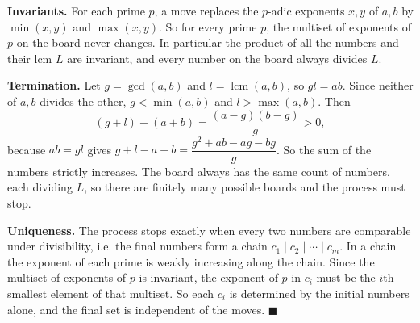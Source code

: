 \textbf{Invariants.} For each prime $p$, a move replaces the $p$-adic exponents $x,y$ of $a,b$ by $\min(x,y)$ and $\max(x,y)$. So for every prime $p$, the multiset of exponents of $p$ on the board never changes. In particular the product of all the numbers and their lcm $L$ are invariant, and every number on the board always divides $L$.

\textbf{Termination.} Let $g=\gcd(a,b)$ and $l=\operatorname{lcm}(a,b)$, so $gl=ab$. Since neither of $a,b$ divides the other, $g<\min(a,b)$ and $l>\max(a,b)$. Then
\[(g+l)-(a+b)=\dfrac{(a-g)(b-g)}{g}>0,\]
because $ab=gl$ gives $g+l-a-b=\dfrac{g^2+ab-ag-bg}{g}$. So the sum of the numbers strictly increases. The board always has the same count of numbers, each dividing $L$, so there are finitely many possible boards and the process must stop.

\textbf{Uniqueness.} The process stops exactly when every two numbers are comparable under divisibility, i.e. the final numbers form a chain $c_1\mid c_2\mid\cdots\mid c_m$. In a chain the exponent of each prime is weakly increasing along the chain. Since the multiset of exponents of $p$ is invariant, the exponent of $p$ in $c_i$ must be the $i$th smallest element of that multiset. So each $c_i$ is determined by the initial numbers alone, and the final set is independent of the moves. $\blacksquare$
